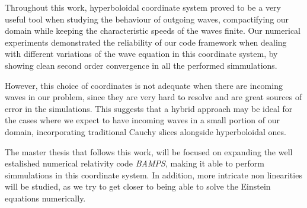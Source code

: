 Throughout this work, hyperboloidal coordinate system proved to be a very useful tool when studying the behaviour of outgoing waves, compactifying our domain while keeping the characteristic speeds of the waves finite. Our numerical experiments demonstrated the reliability of our code framework when dealing with different variations of the wave equation in this coordinate system, by showing clean second order convergence in all the performed simmulations.

However, this choice of coordinates is not adequate when there are incoming waves in our problem, since they are very hard to resolve and are great sources of error in the simulations. This suggests that a hybrid approach may be ideal for the cases where we expect to have incoming waves in a small portion of our domain, incorporating traditional Cauchy slices alongside hyperboloidal ones.

The master thesis that follows this work, will be focused on expanding the well estalished numerical relativity code \textit{BAMPS}, making it able to perform simmulations in this coordinate system. In addition, more intricate non linearities will be studied, as we try to get closer to being able to solve the Einstein equations numerically.